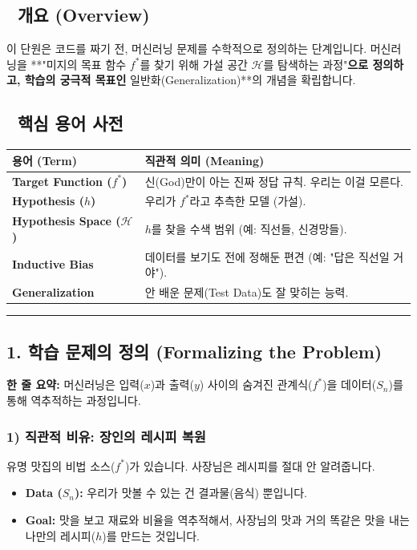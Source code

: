 \documentclass[11pt,a4paper]{book}
\theoremstyle{definition}
\begin{document}
\subsection*{📌 개요 (Overview)}
이 단원은 코드를 짜기 전, 머신러닝 문제를 수학적으로 정의하는 단계입니다. 머신러닝을 **"미지의 목표 함수 $f^*$를 찾기 위해 가설 공간 $\mathcal{H}$를 탐색하는 과정"\textbf{으로 정의하고, 학습의 궁극적 목표인 }일반화(Generalization)**의 개념을 확립합니다.

\subsection*{📝 핵심 용어 사전}
\begin{table}[h]
\centering
\begin{tabularx}{\textwidth}{|p{}|X|}
\hline
\textbf{용어 (Term)} & \textbf{직관적 의미 (Meaning)} \\
\hline
\textbf{Target Function ($f^*$)} & 신(God)만이 아는 진짜 정답 규칙. 우리는 이걸 모른다. \\
\hline
\textbf{Hypothesis ($h$)} & 우리가 $f^*$라고 추측한 모델 (가설). \\
\hline
\textbf{Hypothesis Space ($\mathcal{H}$)} & $h$를 찾을 수색 범위 (예: 직선들, 신경망들). \\
\hline
\textbf{Inductive Bias} & 데이터를 보기도 전에 정해둔 편견 (예: "답은 직선일 거야"). \\
\hline
\textbf{Generalization} & 안 배운 문제(Test Data)도 잘 맞히는 능력. \\
\hline
\end{tabularx}
\end{table}

\vspace{0.5cm}\hrule\vspace{0.5cm}

\subsection{1. 학습 문제의 정의 (Formalizing the Problem)}


\begin{conceptbox}[title={개념 1: 함수 근사 (Function Approximation)}]
\textbf{한 줄 요약:} 머신러닝은 입력($x$)과 출력($y$) 사이의 숨겨진 관계식($f^*$)을 데이터($S_n$)를 통해 역추적하는 과정입니다.
\end{conceptbox}

\subsubsection*{1) 직관적 비유: 장인의 레시피 복원}
유명 맛집의 비법 소스($f^*$)가 있습니다. 사장님은 레시피를 절대 안 알려줍니다.
\begin{itemize}
    \item \textbf{Data ($S_n$):} 우리가 맛볼 수 있는 건 결과물(음식) 뿐입니다.
    \item \textbf{Goal:} 맛을 보고 재료와 비율을 역추적해서, 사장님의 맛과 거의 똑같은 맛을 내는 나만의 레시피($h$)를 만드는 것입니다.
\end{itemize}
\end{document}

